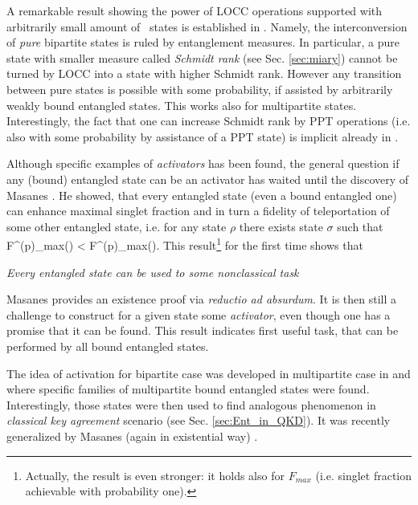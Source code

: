 \documentclass[rmp,12pt,preprint]{revtex4-2}
\begin{document}
A remarkable result showing the power of LOCC operations supported
with arbitrarily small amount of \bent\ states is established in
\cite{Ishizaka04}. Namely, the interconversion of {\it pure} bipartite
states is ruled by entanglement measures. In particular, a pure state
with smaller measure called {\it Schmidt rank} (see Sec.
\ref{sec:miary}) cannot be turned by LOCC into a state with higher
Schmidt rank. However any transition between pure states is possible
with some probability, if assisted by arbitrarily weakly bound
entangled states. This works also for multipartite
states. Interestingly, the fact that one can increase Schmidt rank by
PPT operations (i.e. also with some probability by assistance of a PPT
state) is implicit already in \cite{AudenaertPE2002-PPT}.


Although specific examples of {\it activators} has been found, the
general question if any (bound) entangled state can be an activator
has waited until the discovery of Masanes
\cite{Masanes1_activation,Masanes-multiactiv}. He showed,
that every entangled state (even a bound entangled one) can enhance
maximal singlet fraction and in turn a fidelity of teleportation of some other entangled state, i.e. for any state $\rho$ there exists
state $\sigma$ such that
\be
F^{(p)}_{max}(\sigma) < F^{(p)}_{max}(\rho\ot\sigma).
\ee
This result\footnote{Actually, the result is even stronger: it holds also for $F_{max}$ (i.e. singlet fraction achievable with probability one).} for the first time shows that

\bei
\item {\it Every entangled state can be used to some nonclassical task}
\eei

Masanes provides an existence proof via {\it reductio ad absurdum}. It
is then still a challenge to construct for a given state some {\it
  activator}, even though one has a promise that it can be found. This
result indicates first useful task, that can be performed by all bound
entangled states.


The idea of activation for bipartite case was developed in
multipartite case in \cite{DurCirac_activation} and
\cite{Bandyo_multi_activation} where specific families of
multipartite bound entangled states were found. Interestingly, those
states were then used to find analogous phenomenon in {\it classical
key agreement} scenario (see Sec. \ref{sec:Ent_in_QKD}). It was
recently generalized by Masanes (again in existential way)
\cite{Masanes-multiactiv}.
\end{document}
